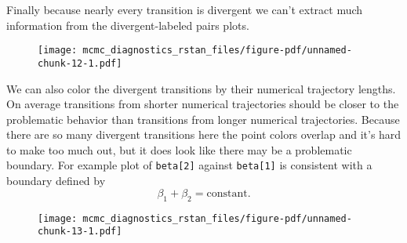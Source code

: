 \documentclass[
  letterpaper,
  DIV=11,
  numbers=noendperiod]{scrartcl}
\newenvironment{Shaded}{\begin{snugshade}}{\end{snugshade}}
\newcommand{\AttributeTok}[1]{\textcolor[rgb]{0.40,0.45,0.13}{#1}}
\newcommand{\DecValTok}[1]{\textcolor[rgb]{0.68,0.00,0.00}{#1}}
\newcommand{\FunctionTok}[1]{\textcolor[rgb]{0.28,0.35,0.67}{#1}}
\newcommand{\NormalTok}[1]{\textcolor[rgb]{0.00,0.23,0.31}{#1}}
\newcommand{\OtherTok}[1]{\textcolor[rgb]{0.00,0.23,0.31}{#1}}
\newcommand{\SpecialCharTok}[1]{\textcolor[rgb]{0.37,0.37,0.37}{#1}}
\begin{document}
Finally because nearly every transition is divergent we can't extract
much information from the divergent-labeled pairs plots.

\begin{Shaded}
\end{Shaded}

\begin{figure}[H]

{\centering \texttt{[image: mcmc\_diagnostics\_rstan\_files/figure-pdf/unnamed-chunk-12-1.pdf]}

}

\end{figure}

We can also color the divergent transitions by their numerical
trajectory lengths. On average transitions from shorter numerical
trajectories should be closer to the problematic behavior than
transitions from longer numerical trajectories. Because there are so
many divergent transitions here the point colors overlap and it's hard
to make too much out, but it does look like there may be a problematic
boundary. For example plot of \texttt{beta{[}2{]}} against
\texttt{beta{[}1{]}} is consistent with a boundary defined by \[
\beta_{1} + \beta_{2} = \mathrm{constant}.
\]

\begin{Shaded}
\end{Shaded}

\begin{figure}[H]

{\centering \texttt{[image: mcmc\_diagnostics\_rstan\_files/figure-pdf/unnamed-chunk-13-1.pdf]}

}

\end{figure}
\end{document}
